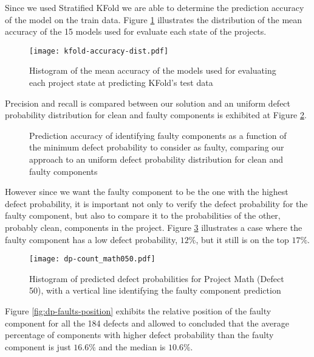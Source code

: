 Since we used Stratified KFold we are able to determine the prediction accuracy of the model on the train data. Figure \ref{fig:kfold-accuracy-dist} illustrates the distribution of the mean accuracy of the 15 models used for evaluate each state of the projects.
%
\begin{figure}[ht]
  \begin{center}
    \leavevmode
    \texttt{[image: kfold-accuracy-dist.pdf]}
    \caption{Histogram of the mean accuracy of the models used for evaluating each project state at predicting KFold's test data}
    \label{fig:kfold-accuracy-dist}
  \end{center}
\end{figure}

Precision and recall is compared between our solution and an uniform defect probability distribution for clean and faulty components is exhibited at Figure \ref{fig:dp-precision-recall}.
%
\begin{figure}[ht]%
    \centering
    \qquad
    \caption{Prediction accuracy of identifying faulty components as a function of the minimum defect probability to consider as faulty, comparing our approach to an uniform defect probability distribution for clean and faulty components}%
    \label{fig:dp-precision-recall}%
\end{figure}

However since we want the faulty component to be the one with the highest defect probability, it is important not only to verify the defect probability for the faulty component, but also to compare it to the probabilities of the other, probably clean, components in the project. Figure \ref{fig:dp-count} illustrates a case where the faulty component has a low defect probability, $12\%$, but it still is on the top $17\%$.
%
\begin{figure}[ht]
  \begin{center}
    \leavevmode
    \texttt{[image: dp-count\_math050.pdf]}
    \caption{Histogram of predicted defect probabilities for Project Math (Defect 50), with a vertical line identifying the faulty component prediction}
    \label{fig:dp-count}
  \end{center}
\end{figure}

Figure \ref{fig:dp-faults-position} exhibits the relative position of the faulty component for all the 184 defects and allowed to concluded that the average percentage of components with higher defect probability than the faulty component is just $16.6\%$ and the median is $10.6\%$.


